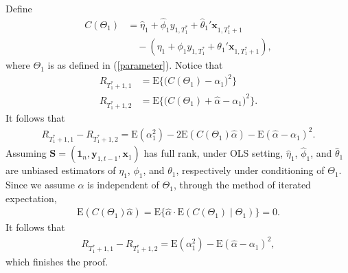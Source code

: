 \documentclass[11pt,3p,review,authoryear]{elsarticle}
\def\mbf#1{\mathbf{#1}} %
\def\mrm#1{\mathrm{#1}} %
\def\E#1{\mathrm{E}(#1)} %
\theoremstyle{definition}
\newenvironment{proof-of-lemma}[1][{}]{\noindent{\bf
    Proof of Lemma {#1}}
  \hspace*{.5em}}{\qed\bigskip\\}
\begin{document}
  
\begin{proof-of-lemma}[\ref{risklemma}]
  Define 
  \begin{align*}
    C(\Theta_1) &=\hat{\eta}_1 +\hat{\phi}_1 y_{1, T_1^*}+\hat{\theta}_1'\mbf{x}_{1, T_1^*+1} \\
    & \quad -(\eta_1 +\phi_1y_{1,T_1^*}+\theta_1'\mbf{x}_{1,T_1^*+1}),
  \end{align*}
  where $\Theta_1$ is as defined in (\ref{parameter}). Notice that
  \begin{align*}
    R_{T_1^*+1,1}
    &= \mrm{E}\big\{\big(C(\Theta_1)-\alpha_1\big)^2\big\}\\
     R_{T_1^*+1,2} &=  \mrm{E}\big\{\big(C(\Theta_1)+\hat{\alpha}-\alpha_1\big)^2\big\}.
  \end{align*}
  It follows that
  \begin{align*}
    R_{T_1^*+1,1}-R_{T_1^*+1,2}=\E{\alpha_1^2}-2\E{C(\Theta_1)\hat{\alpha}}-\E{\hat{\alpha}-\alpha_1}^2.
  \end{align*}
  Assuming $\mbf{S}=(\mbf{1}_n, \mbf{y}_{1,t-1}, \mbf{x}_{1})$ has full rank, under OLS setting, $\hat{\eta}_1$, $\hat{\phi}_1$, and $\hat{\theta}_1$ are unbiased estimators of $\eta_1$, $\phi_1$, and $\theta_1$, respectively under conditioning of $\Theta_1$. Since we assume $\hat{\alpha}$ is independent of $\Theta_1$, through the method of iterated expectation,
  \begin{align*}
    \E{C(\Theta_1)\hat{\alpha}}=\mrm{E}\big\{\hat{\alpha}\cdot \E{C(\Theta_1)\mid \Theta_1}\}=0.
  \end{align*}
  It follows that
  \begin{align*}
    R_{T_1^*+1,1}-R_{T_1^*+1,2}=\E{\alpha_1^2}-\E{\hat{\alpha}-\alpha_1}^2,
  \end{align*}
  which finishes the proof.
\end{proof-of-lemma}
\end{document}
